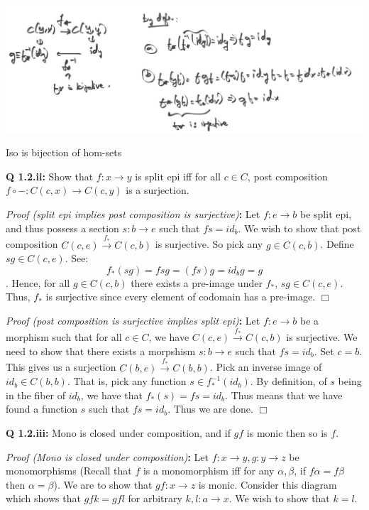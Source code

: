 \documentclass[11pt]{book}
\def\qed{$\Box$}
\newcommand{\beginproof}[1][]{\emph{Proof #1}\textbf{:} }
\newcommand{\question}[1]{\textbf{#1}}
\begin{document}
\begin{minipage}{\textwidth}
\includegraphics[width=\textwidth]{ch1/iso-is-bijection-of-hom.png}
    \begin{center}Iso is bijection of hom-sets\end{center}
\end{minipage}

\question{Q 1.2.ii:} Show that $f: x \rightarrow y$ is split epi iff for all $c \in C$, post composition
$f \circ - : C(c, x) \rightarrow C(c, y)$ is a surjection.


\beginproof[(split epi implies post composition is surjective)]
Let $f: e \rightarrow b$ be split epi, and thus possess a section $s: b \rightarrow e$ such that $fs = id_b$.
We wish to show that post composition $C(c, e) \xrightarrow{f_*} C(c, b)$ is surjective.
So pick any $g \in C(c, b)$. Define $sg \in C(c, e)$. See: $$f_*(sg) = fsg = (fs)g = id_b g = g$$.
Hence, for all $g \in C(c, b)$ there exists a pre-image under $f_*$, $sg \in C(c, e)$. Thus, $f_*$ is surjective
since every element of codomain has a pre-image. \qed


\beginproof[(post composition is surjective implies split epi)]
Let $f: e \to b$ be a morphism such that for all $c \in C$, we have $C(c, e) \xrightarrow{f_*} C(c, b)$ is surjective.
We need to show that there exists a morpshism $s: b \rightarrow e$ such that $fs = id_b$. Set $c = b$.
This gives us a surjection $C(b, e) \xrightarrow{f_*} C(b, b)$. Pick an inverse image of $id_b \in C(b, b)$. 
That is, pick any function $s \in f_*^{-1}(id_b)$. By definition, of $s$ being in the fiber of $id_b$,
we have that $f_*(s) = fs = id_b$. Thus means that we have found a function $s$ such that $fs = id_b$. Thus we are done.
\qed

\question{Q 1.2.iii:} Mono is closed under composition, and if $gf$ is monic then so is $f$.


\beginproof[(Mono is closed under composition)]
Let $f: x \to y, g: y \to z$ be monomorphisms (Recall that $f$ is a monomorphism iff for any $\alpha, \beta$, if $f \alpha = f \beta$ then $\alpha = \beta$).
We are to show that $gf: x \to z$ is monic.
Consider this diagram which shows that $gfk = gfl$ for arbitrary $k, l: a \to x$. We wish to show that $k=l$.
\end{document}
